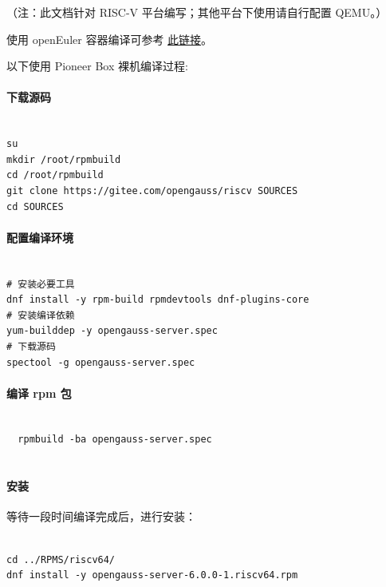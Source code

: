 \documentclass{article}
\begin{document}
（注：此文档针对 RISC-V 平台编写；其他平台下使用请自行配置 QEMU。）

使用 openEuler 容器编译可参考 \href{https://github.com/QA-Team-lo/dbtest/blob/main/opengauss/install.md}{此链接}。

以下使用 Pioneer Box 裸机编译过程:

\paragraph{下载源码}

\begin{verbatim}
  
su 
mkdir /root/rpmbuild
cd /root/rpmbuild
git clone https://gitee.com/opengauss/riscv SOURCES
cd SOURCES

\end{verbatim}

\paragraph{配置编译环境}

\begin{verbatim}
  
# 安装必要工具
dnf install -y rpm-build rpmdevtools dnf-plugins-core
# 安装编译依赖
yum-builddep -y opengauss-server.spec
# 下载源码
spectool -g opengauss-server.spec

\end{verbatim}

\paragraph{编译 rpm 包}

\begin{verbatim}
  
  rpmbuild -ba opengauss-server.spec
  
\end{verbatim}

\paragraph{安装}

等待一段时间编译完成后，进行安装：

\begin{verbatim}
  
cd ../RPMS/riscv64/
dnf install -y opengauss-server-6.0.0-1.riscv64.rpm

\end{verbatim}
\end{document}

